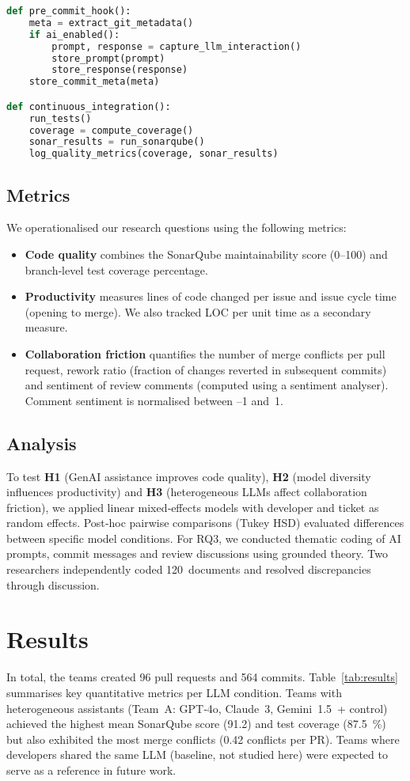 \documentclass[conference]{IEEEtran}
\begin{document}
\begin{lstlisting}[language=Python, caption={Simplified data‑collection pipeline.}]
def pre_commit_hook():
    meta = extract_git_metadata()
    if ai_enabled():
        prompt, response = capture_llm_interaction()
        store_prompt(prompt)
        store_response(response)
    store_commit_meta(meta)

def continuous_integration():
    run_tests()
    coverage = compute_coverage()
    sonar_results = run_sonarqube()
    log_quality_metrics(coverage, sonar_results)
\end{lstlisting}

\subsection{Metrics}
We operationalised our research questions using the following metrics:
\begin{itemize}
  \item \textbf{Code quality} combines the SonarQube maintainability score (0–100) and branch‑level test coverage percentage.
  \item \textbf{Productivity} measures lines of code changed per issue and issue cycle time (opening to merge).  We also tracked LOC per unit time as a secondary measure.
  \item \textbf{Collaboration friction} quantifies the number of merge conflicts per pull request, rework ratio (fraction of changes reverted in subsequent commits) and sentiment of review comments (computed using a sentiment analyser).  Comment sentiment is normalised between –1 and 1.
\end{itemize}

\subsection{Analysis}
To test \textbf{H1} (GenAI assistance improves code quality), \textbf{H2} (model diversity influences productivity) and \textbf{H3} (heterogeneous LLMs affect collaboration friction), we applied linear mixed‑effects models with developer and ticket as random effects.  Post‑hoc pairwise comparisons (Tukey HSD) evaluated differences between specific model conditions.  For RQ3, we conducted thematic coding of AI prompts, commit messages and review discussions using grounded theory.  Two researchers independently coded 120 documents and resolved discrepancies through discussion.

\iffalse
\section{Results}
In total, the teams created 96 pull requests and 564 commits.  Table \ref{tab:results} summarises key quantitative metrics per LLM condition.  Teams with heterogeneous assistants (Team A: GPT‑4o, Claude 3, Gemini 1.5 + control) achieved the highest mean SonarQube score (91.2) and test coverage (87.5 \%) but also exhibited the most merge conflicts (0.42 conflicts per PR).  Teams where developers shared the same LLM (baseline, not studied here) were expected to serve as a reference in future work.
\end{document}
